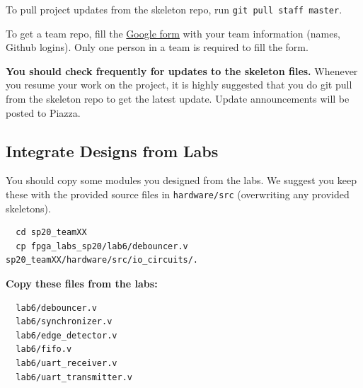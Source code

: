 \documentclass[11pt]{article}
\begin{document}
To pull project updates from the skeleton repo, run \verb|git pull staff master|.

To get a team repo, fill the \href{https://docs.google.com/forms/d/1oBUvG6DH-QeFeeiaRB2vwItycJ2V-RA0Zt5n1dMdOco}{Google form} with your team information (names, Github logins). Only one person in a team is required to fill the form.

\textbf{You should check frequently for updates to the skeleton files.} Whenever you resume your work on the project,
it is highly suggested that you do git pull from the skeleton repo to get the latest update.
Update announcements will be posted to Piazza.

\subsection{Integrate Designs from Labs} \label{past_designs}
You should copy some modules you designed from the labs.
We suggest you keep these with the provided source files in \verb|hardware/src| (overwriting any provided skeletons).

\begin{verbatim}
  cd sp20_teamXX
  cp fpga_labs_sp20/lab6/debouncer.v sp20_teamXX/hardware/src/io_circuits/.
\end{verbatim}

\textbf{Copy these files from the labs:}
\begin{verbatim}
  lab6/debouncer.v
  lab6/synchronizer.v
  lab6/edge_detector.v
  lab6/fifo.v
  lab6/uart_receiver.v
  lab6/uart_transmitter.v
\end{verbatim}
\end{document}
